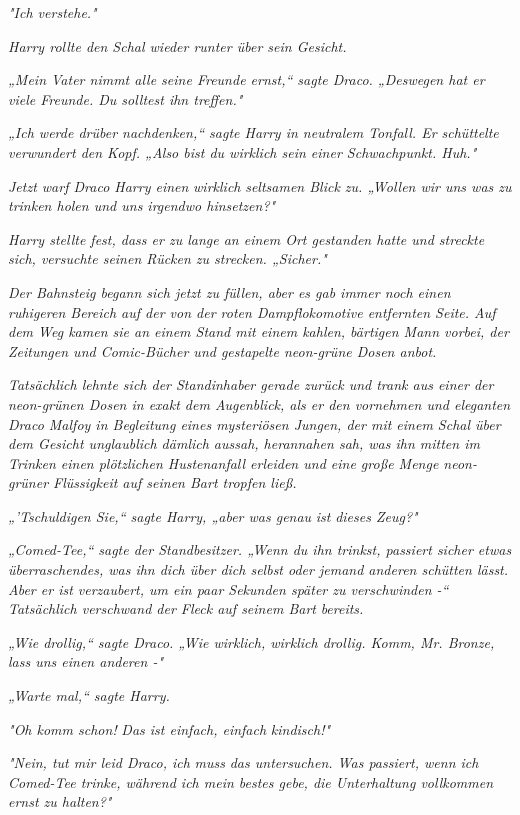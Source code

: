 {\emph{"Ich verstehe."}

\emph{Harry rollte den Schal wieder runter über sein Gesicht.}

\emph{„Mein Vater nimmt alle seine Freunde ernst,“ sagte Draco. „Deswegen hat er viele Freunde. Du solltest ihn treffen."}

\emph{„Ich werde drüber nachdenken,“ sagte Harry in neutralem Tonfall. Er schüttelte verwundert den Kopf. „Also bist du wirklich sein einer Schwachpunkt. Huh."}

\emph{Jetzt warf Draco Harry einen} \emph{\emph{wirklich}} \emph{seltsamen Blick zu. „Wollen wir uns was zu trinken holen und uns irgendwo hinsetzen?"}

\emph{Harry stellte fest, dass er zu lange an einem Ort gestanden hatte und streckte sich, versuchte seinen Rücken zu strecken. „Sicher."}

\emph{Der Bahnsteig begann sich jetzt zu füllen, aber es gab immer noch einen ruhigeren Bereich auf der von der roten Dampflokomotive entfernten Seite. Auf dem Weg kamen sie an einem Stand mit einem kahlen, bärtigen Mann vorbei, der Zeitungen und Comic-Bücher und gestapelte neon-grüne Dosen anbot.}

\emph{Tatsächlich lehnte sich der Standinhaber gerade zurück und trank aus einer der neon-grünen Dosen in exakt dem Augenblick, als er den vornehmen und eleganten Draco Malfoy in Begleitung eines mysteriösen Jungen, der mit einem Schal über dem Gesicht unglaublich dämlich aussah, herannahen sah, was ihn mitten im Trinken einen plötzlichen Hustenanfall erleiden und eine große Menge neon-grüner Flüssigkeit auf seinen Bart tropfen ließ.}

\emph{„'Tschuldigen Sie,“ sagte Harry, „aber was genau} \emph{\emph{ist}} \emph{dieses Zeug?"}

\emph{„Comed-Tee,“ sagte der Standbesitzer. „Wenn du ihn trinkst, passiert sicher etwas überraschendes, was ihn dich über dich selbst oder jemand anderen schütten lässt. Aber er ist verzaubert, um ein paar Sekunden später zu verschwinden -“ Tatsächlich verschwand der Fleck auf seinem Bart} \emph{bereits.}

\emph{„Wie drollig,“ sagte Draco. „Wie wirklich, wirklich drollig. Komm, Mr. Bronze, lass uns einen anderen -"}

\emph{„Warte mal,“ sagte Harry.}

\emph{"\emph{Oh komm schon!}} \emph{Das ist einfach, einfach} \emph{\emph{kindisch!}"}

\emph{"Nein, tut mir leid Draco, ich} \emph{\emph{muss}} \emph{das untersuchen. Was passiert, wenn ich Comed-Tee trinke, während ich mein bestes gebe, die Unterhaltung vollkommen ernst zu halten?"}

}

